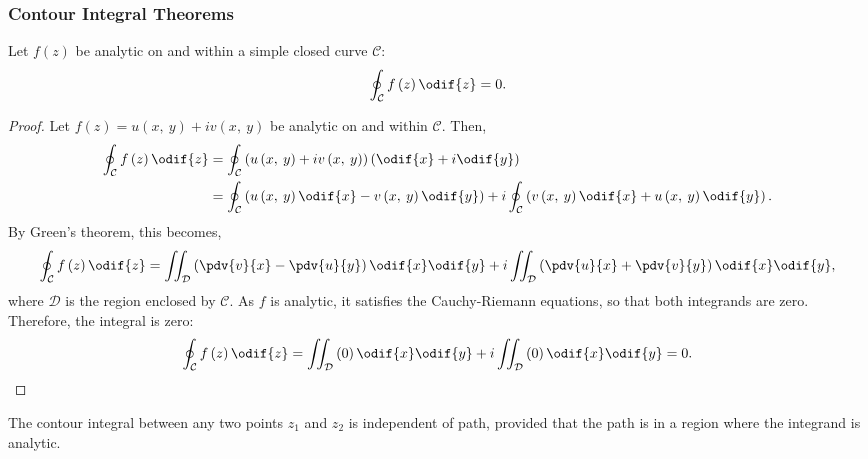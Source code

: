 \documentclass{article}
\begin{document}
\subsubsection{Contour Integral Theorems}
\begin{theorem}
    Let \(f\left( z \right)\) be analytic on and within a simple closed
    curve \(\mathcal{C}\):
    \begin{equation*}
        \oint_{\mathcal{C}} f\left( z \right) \odif{z} = 0.
    \end{equation*}
\end{theorem}
\begin{proof}
    Let \(f\left( z \right) = u\left( x,\: y \right) + i v\left( x,\: y \right)\)
    be analytic on and within \(\mathcal{C}\). Then,
    \begin{align*}
        \oint_{\mathcal{C}} f\left( z \right) \odif{z} & = \oint_{\mathcal{C}} \left( u\left( x,\: y \right) + i v\left( x,\: y \right) \right) \left( \odif{x} + i \odif{y} \right)                                                                                      \\
                                                       & = \oint_{\mathcal{C}} \left( u\left( x,\: y \right) \odif{x} - v\left( x,\: y \right) \odif{y} \right) + i \oint_{\mathcal{C}} \left( v\left( x,\: y \right) \odif{x} + u\left( x,\: y \right) \odif{y} \right).
    \end{align*}
    By Green's theorem, this becomes,
    \begin{equation*}
        \oint_{\mathcal{C}} f\left( z \right) \odif{z} = \iint_{\mathcal{D}} \left( \pdv{v}{x} - \pdv{u}{y} \right) \odif{x} \odif{y} + i \iint_{\mathcal{D}} \left( \pdv{u}{x} + \pdv{v}{y} \right) \odif{x} \odif{y},
    \end{equation*}
    where \(\mathcal{D}\) is the region enclosed by \(\mathcal{C}\). As
    \(f\) is analytic, it satisfies the Cauchy-Riemann equations, so that
    both integrands are zero. Therefore, the integral is zero:
    \begin{equation*}
        \oint_{\mathcal{C}} f\left( z \right) \odif{z} = \iint_{\mathcal{D}} \left( 0 \right) \odif{x} \odif{y} + i \iint_{\mathcal{D}} \left( 0 \right) \odif{x} \odif{y} = 0.
    \end{equation*}
\end{proof}
\begin{corollary}
    The contour integral between any two points \(z_1\) and \(z_2\) is
    independent of path, provided that the path is in a region where the
    integrand is analytic.
\end{corollary}
\end{document}
